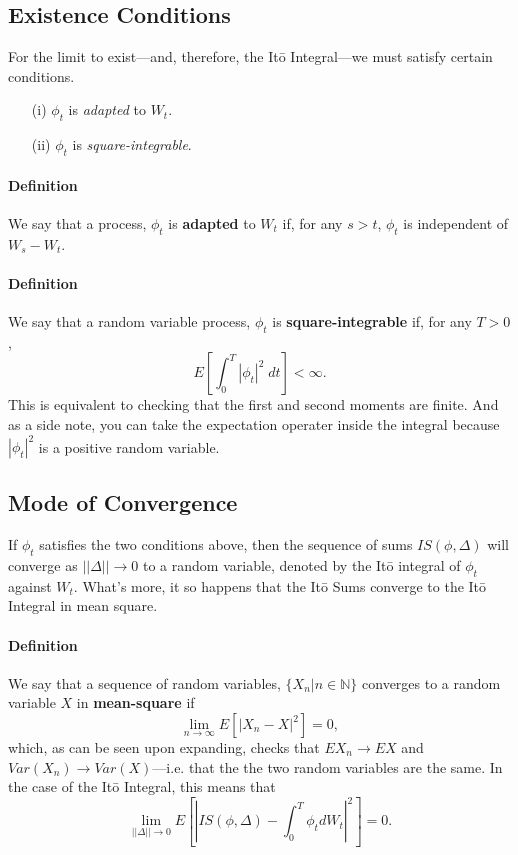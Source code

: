 \documentclass[a4paper,12pt]{scrartcl}
\begin{document}
\subsection{Existence Conditions}

For the limit to exist---and, therefore, the It\={o} Integral---we must
satisfy certain conditions.
\begin{enumerate}[]
   \item[(i)]{$\phi_t$ is \emph{adapted} to $W_t$.}
   \item[(ii)]{$\phi_t$ is \emph{square-integrable}.} 
\end{enumerate}

\paragraph{Definition} We say that a process, $\phi_t$ is 
\textbf{adapted} to $W_t$ if, for any $s > t$, $\phi_t$ is independent
of $W_s - W_t$.

\paragraph{Definition} We say that a random variable process, $\phi_t$ is
\textbf{square-integrable} if, for any $T>0$,
   \[E \left[ \int^T_0 |\phi_t|^2 \; dt \right] < \infty.\]
This is equivalent to checking that the first and second moments are
finite.  
And as a side note, you can take the expectation operater inside the 
integral because $|\phi_t|^2$ is a positive random variable.

\subsection{Mode of Convergence}

If $\phi_t$ satisfies the two conditions above, then the sequence of 
sums $IS(\phi, \Delta)$ will converge as $||\Delta||\rightarrow 0$ to a 
random variable, denoted by the It\={o} integral of $\phi_t$ against
$W_t$. What's more, it so happens that the It\={o} Sums converge to 
the It\={o} Integral in mean square.

\paragraph{Definition} We say that a sequence of random variables, 
$\{ X_n | n \in \mathbb{N} \}$ converges to a random variable $X$ in 
\textbf{mean-square} if
   \[\lim_{n \rightarrow \infty} E\left[ |X_n - X|^2 \right] = 0, \]
which, as can be seen upon expanding, checks that $EX_n \rightarrow
EX$ and $Var(X_n) \rightarrow Var(X)$---i.e. that the the two random 
variables are the same. 
In the case of the It\={o} Integral, this means that 
   \[\lim_{||\Delta||\rightarrow 0} E \left[ \left\lvert IS(\phi, \Delta)
      - \int_0^T \phi_t dW_t \right\rvert^2 \right] = 0.\]
\end{document}

